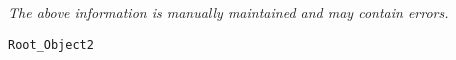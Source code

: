 \label{pkg:root\_object2}

{\tiny \it The above information is manually maintained and may contain errors.}
\begin{verbatim}
Root_Object2
\end{verbatim}
